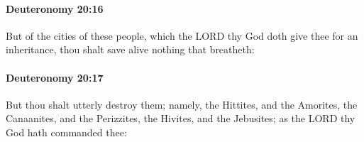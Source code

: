 		\paragraph{Deuteronomy 20:16} %
			\label{DEUTERONOMY-20-16}

			But of the cities of these people, which the LORD thy God doth give thee for an inheritance, thou shalt save alive nothing that breatheth:


		\paragraph{Deuteronomy 20:17} %
			\label{DEUTERONOMY-20-17}

			But thou shalt utterly destroy them; namely, the Hittites, and the Amorites, the Canaanites, and the Perizzites, the Hivites, and the Jebusites; as the LORD thy God hath commanded thee:


